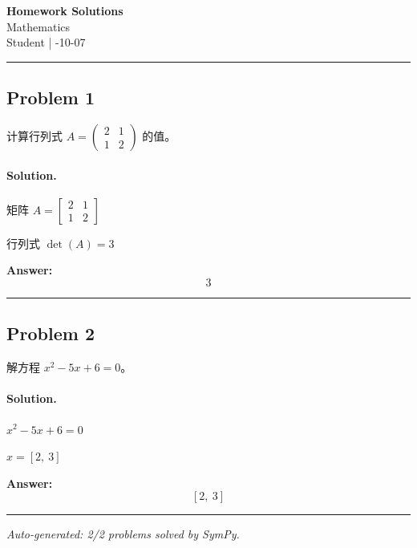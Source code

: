 \documentclass[12pt, a4paper]{article}
\newcommand{\problem}[1]{\subsection*{Problem #1}}
\newcommand{\solution}{\paragraph{Solution.}}
\begin{document}
\begin{center}
    {\LARGE\bfseries Homework Solutions} \\[0.5em]
    {\large Mathematics} \\[0.3em]
    Student \quad | -10-07
\end{center}

\hrule
\vspace{1em}
\problem{1}

计算行列式 $A = \begin{pmatrix} 2 & 1 \\ 1 & 2 \end{pmatrix}$ 的值。

\solution

矩阵 $A = \left[\begin{matrix}2 & 1\\1 & 2\end{matrix}\right]$

行列式 $\det(A) = 3$

\textbf{Answer:}
\[\boxed{3}\]

\vspace{1em}
\hrule
\vspace{1em}

\problem{2}

解方程 $x^2 - 5x + 6 = 0$。

\solution

$x^{2} - 5 x + 6 = 0$

$x = \left[ 2, \  3\right]$

\textbf{Answer:}
\[\boxed{\left[ 2, \  3\right]}\]

\vspace{1em}
\hrule
\vspace{1em}


\vspace{2em}
\noindent\textit{Auto-generated: 2/2 problems solved by SymPy.}
\end{document}
